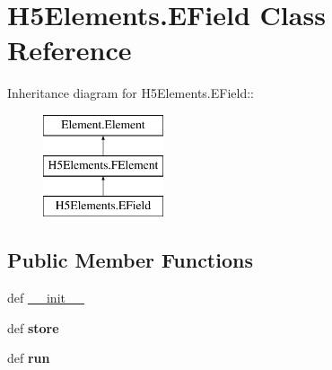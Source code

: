 \hypertarget{classH5Elements_1_1EField}{
\section{H5Elements.EField Class Reference}
\label{classH5Elements_1_1EField}
}
Inheritance diagram for H5Elements.EField::\begin{figure}[H]
\begin{center}
\leavevmode
\includegraphics[height=3cm]{classH5Elements_1_1EField}
\end{center}
\end{figure}
\subsection*{Public Member Functions}
\begin{DoxyCompactItemize}
\item 
def \hyperlink{classH5Elements_1_1EField_ad58a5277143c1a17c5e004c92081d937}{\_\-\_\-init\_\-\_\-}
\item 
\hypertarget{classH5Elements_1_1EField_a840c5d5bebc6d08587c2d8a06dbbe3d2}{
def {\bfseries store}}
\label{classH5Elements_1_1EField_a840c5d5bebc6d08587c2d8a06dbbe3d2}

\item 
\hypertarget{classH5Elements_1_1EField_a49582f2fbeefde265a26e5f679a47f9e}{
def {\bfseries run}}
\label{classH5Elements_1_1EField_a49582f2fbeefde265a26e5f679a47f9e}

\end{DoxyCompactItemize}
